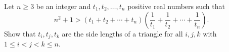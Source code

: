 Let $n \geq 3$ be an integer and $t_1, t_2, \ldots, t_n$ positive real numbers such that
\[ n^2 + 1 > (t_1 + t_2 + \cdots + t_n)\left( \frac{1}{t_1} + \frac{1}{t_2} + \cdots + \frac{1}{t_n} \right). \]
Show that $t_i, t_j, t_k$ are the side lengths of a triangle for all $i, j, k$ with $1 \leq i < j < k \leq n$.
